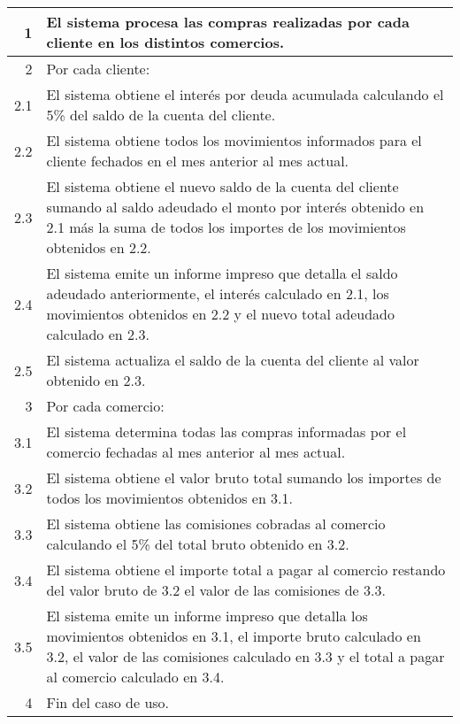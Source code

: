 \begin{tabularx}{\textwidth}{| r | X |}
\hline
1 & El sistema procesa las compras realizadas por cada cliente en los distintos
comercios. \\
\hline
2 & Por cada cliente: \\
\hline
2.1 & El sistema obtiene el interés por deuda acumulada calculando el 5\% del
saldo de la cuenta del cliente. \\
\hline
2.2 & El sistema obtiene todos los movimientos informados para el cliente
fechados en el mes anterior al mes actual. \\
\hline
2.3 & El sistema obtiene el nuevo saldo de la cuenta del cliente sumando al
saldo adeudado el monto por interés obtenido en 2.1 más la suma de todos los
importes de los movimientos obtenidos en 2.2. \\
\hline
2.4 & El sistema emite un informe impreso que detalla el saldo adeudado
anteriormente, el interés calculado en 2.1, los movimientos obtenidos en 2.2 y
el nuevo total adeudado calculado en 2.3. \\
\hline
2.5 & El sistema actualiza el saldo de la cuenta del cliente al valor obtenido en 2.3. \\
\hline
3 & Por cada comercio: \\
\hline
3.1 & El sistema determina todas las compras informadas por el comercio
fechadas al mes anterior al mes actual. \\
\hline
3.2 & El sistema obtiene el valor bruto total sumando los importes de todos los
movimientos obtenidos en 3.1. \\
\hline
3.3 & El sistema obtiene las comisiones cobradas al comercio calculando el 5\%
del total bruto obtenido en 3.2. \\
\hline
3.4 & El sistema obtiene el importe total a pagar al comercio restando del
valor bruto de 3.2 el valor de las comisiones de 3.3. \\
\hline
3.5 & El sistema emite un informe impreso que detalla los movimientos obtenidos
en 3.1, el importe bruto calculado en 3.2, el valor de las comisiones calculado
en 3.3 y el total a pagar al comercio calculado en 3.4. \\
\hline
4 & Fin del caso de uso. \\

\hline
\end{tabularx}

